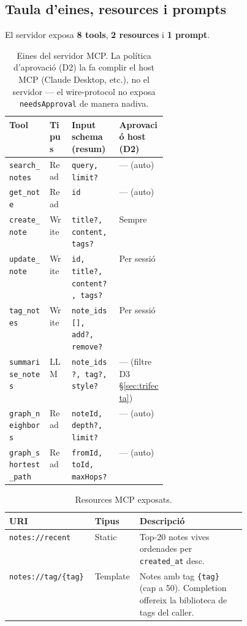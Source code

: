 \subsection{Taula d'eines, resources i prompts}
\label{sec:taula-eines}

El servidor exposa \textbf{8 tools}, \textbf{2 resources} i
\textbf{1 prompt}.

\begin{table}[H]
    \centering
    \footnotesize
    \begin{tabular}{|l|l|p{0.30\linewidth}|l|}
        \hline
        \textbf{Tool} & \textbf{Tipus} &
            \textbf{Input schema (resum)} & \textbf{Aprovació host (D2)} \\
        \hline
        \texttt{search\_notes} & Read &
            \texttt{query, limit?} & --- (auto) \\
        \texttt{get\_note} & Read &
            \texttt{id} & --- (auto) \\
        \texttt{create\_note} & Write &
            \texttt{title?, content, tags?} & Sempre \\
        \texttt{update\_note} & Write &
            \texttt{id, title?, content?, tags?} & Per sessió \\
        \texttt{tag\_notes} & Write &
            \texttt{note\_ids[], add?, remove?} & Per sessió \\
        \texttt{summarise\_notes} & LLM &
            \texttt{note\_ids?, tag?, style?} & --- (filtre D3 \S\ref{sec:trifecta}) \\
        \texttt{graph\_neighbors} & Read &
            \texttt{noteId, depth?, limit?} & --- (auto) \\
        \texttt{graph\_shortest\_path} & Read &
            \texttt{fromId, toId, maxHops?} & --- (auto) \\
        \hline
    \end{tabular}
    \caption{Eines del servidor MCP. La política d'aprovació (D2) la
        fa complir el host MCP (Claude Desktop, etc.), no el
        servidor --- el wire-protocol no exposa
        \texttt{needsApproval} de manera nadiva.}
    \label{tab:mcp-tools}
\end{table}

\begin{table}[H]
    \centering
    \footnotesize
    \begin{tabular}{|l|l|p{0.45\linewidth}|}
        \hline
        \textbf{URI} & \textbf{Tipus} & \textbf{Descripció} \\
        \hline
        \texttt{notes://recent} & Static &
            Top-20 notes vives ordenades per \texttt{created\_at} desc. \\
        \texttt{notes://tag/\{tag\}} & Template &
            Notes amb tag \texttt{\{tag\}} (cap a 50). Completion
            offereix la biblioteca de tags del caller. \\
        \hline
    \end{tabular}
    \caption{Resources MCP exposats.}
    \label{tab:mcp-resources}
\end{table}

